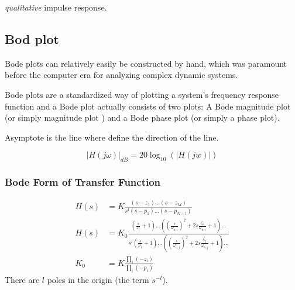 \textit{qualitative} impulse response.

\subsection{Bod plot}
Bode plots can relatively easily be constructed by hand, which was
paramount before the computer era for analyzing complex dynamic systems. \newline

Bode plots are a standardized way of plotting a system's frequency response function
and a Bode plot actually consists of two plots: A Bode magnitude plot (or simply
magnitude plot ) and a Bode phase plot (or simply a phase plot). \newline

Asymptote is the line where define the direction of the line.


\begin{equation*}
    |H(j\omega)|_{dB} = 20\log_{10}(|H(jw)|)
\end{equation*}

\subsubsection{Bode Form of Transfer Function}
\begin{align*}
    H(s) &= K \frac{(s-z_1)\ldots(s-z_M)}{s^l(s-p_1)\ldots(s-p_{N-l})} \\
    H(s) &= K_0 \frac{ (\frac{s}{z_1}+1)\ldots((\frac{s}{\omega_{n,i}})^2+2s\frac{\zeta_i}{\omega_{n,i}}+1)\ldots }{ s^l( \frac{s}{p_1}+1) \ldots ((\frac{s}{\omega_{n,j}})^2+2s\frac{\zeta_j}{\omega_{n,j}}+1)\ldots } \\
    K_0 &= K \frac{ \prod_i(-z_i) }{ \prod_i(-p_i) }
\end{align*}
There are $l$ poles in the origin (the term $s^{-l}$). 


